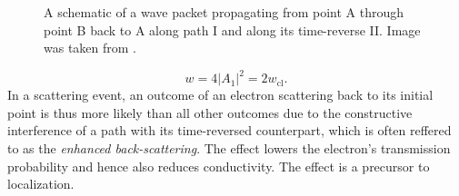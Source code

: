 \documentclass[10pt,a4paper]{article}
\begin{document}
\begin{minipage}[t]{0.39\textwidth}
\begin{figure}[H]
\caption{A schematic of a wave packet propagating from point A through point B back to A along path I and along its time-reverse II. Image was taken from \cite{50yearsof}.}
\label{fig:paths} 
\end{figure}
\end{minipage}
\noindent
\begin{equation}
w=4|A_1|^2=2w_\mathrm{cl}.
\end{equation}
In a scattering event, an outcome of an electron scattering back to its initial point is thus more likely than all other outcomes due to the constructive interference of a path with its time-reversed counterpart, which is often reffered to as the \emph{enhanced back-scattering}. The effect lowers the electron's transmission probability and hence also reduces conductivity. The effect is a precursor to localization.
\end{document}
